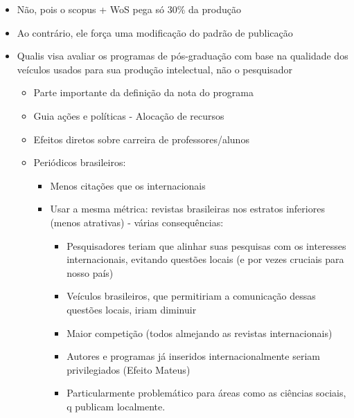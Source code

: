 \documentclass[bigger]{beamer}
\begin{document}
\begin{frame}[label={sec:orga071a55}]{\cite{mugnaini2019}}
\begin{itemize}
\item Não, pois o scopus + WoS pega só 30\% da produção
\item Ao contrário, ele força uma modificação do padrão de publicação
\end{itemize}


\begin{itemize}
\item Qualis visa avaliar os programas de pós-graduação com base na qualidade dos veículos usados para sua produção intelectual, não o pesquisador \parencite{barata2016}
\begin{itemize}
\item Parte importante da definição da nota do programa
\item Guia ações e políticas - Alocação de recursos
\item Efeitos diretos sobre carreira de professores/alunos
\item Periódicos brasileiros:
\begin{itemize}
\item Menos citações que os internacionais
\item Usar a mesma métrica: revistas brasileiras nos estratos inferiores (menos atrativas) - várias consequências:
\begin{itemize}
\item Pesquisadores teriam que alinhar suas pesquisas com os interesses internacionais, evitando questões locais (e por vezes cruciais para nosso país)
\item Veículos brasileiros, que permitiriam a comunicação dessas questões locais, iriam diminuir
\item Maior competição (todos almejando as revistas internacionais)
\item Autores e programas já inseridos internacionalmente seriam privilegiados (Efeito Mateus)
\item Particularmente problemático para áreas como as ciências sociais, q publicam localmente.
\end{itemize}
\end{itemize}
\end{itemize}
\end{itemize}
\end{frame}
\end{document}
